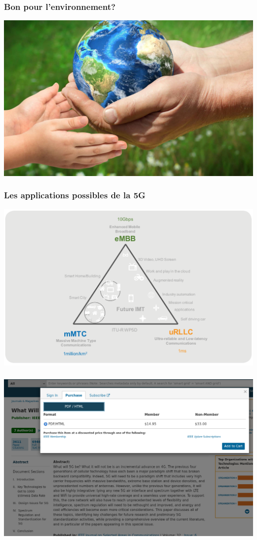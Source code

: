 \documentclass{beamer}
\begin{document}
    \begin{frame}
        \frametitle{Bon pour l'environnement?}
        \includegraphics[width=\linewidth]{img/green.jpg}
    \end{frame}

    \begin{frame}
        \frametitle{Les applications possibles de la 5G}
        \includegraphics[width=\linewidth]{img/application.png}
    \end{frame}

    \begin{frame}
        \frametitle{}
        \includegraphics[width=\linewidth]{img/magazine.png}
    \end{frame}
\end{document}
